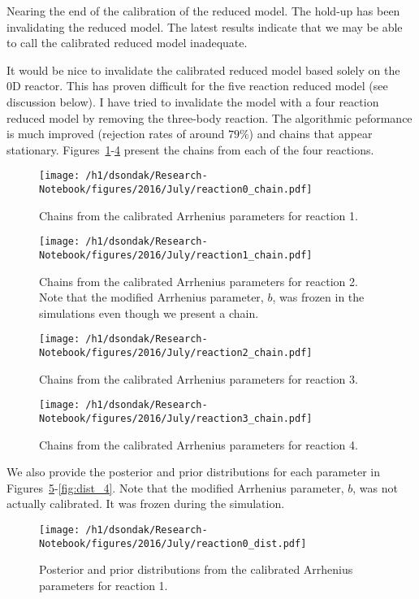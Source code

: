 
Nearing the end of the calibration of the reduced model.  The hold-up has been invalidating the
reduced model.  The latest results indicate that we may be able to call the calibrated
reduced model inadequate.

It would be nice to invalidate the calibrated reduced model based solely on the 0D reactor.  This has proven difficult
for the five reaction reduced model (see discussion below).  I have tried to invalidate the model with a four
reaction reduced model by removing the three-body reaction.  The algorithmic peformance is much improved (rejection
rates of around $79\%$) and chains that appear stationary.  Figures~\ref{fig:chain_1}-\ref{fig:chain_4} present
the chains from each of the four reactions.
\begin{figure}[h!]
  \centering
  \texttt{[image: /h1/dsondak/Research-Notebook/figures/2016/July/reaction0\_chain.pdf]}
  \caption{Chains from the calibrated Arrhenius parameters for reaction 1.}
  \label{fig:chain_1}
\end{figure}
\begin{figure}[h!]
  \centering
  \texttt{[image: /h1/dsondak/Research-Notebook/figures/2016/July/reaction1\_chain.pdf]}
  \caption{Chains from the calibrated Arrhenius parameters for reaction 2.  Note that the modified Arrhenius
           parameter, $b$, was frozen in the simulations even though we present a chain.}
  \label{fig:chain_2}
\end{figure}
\begin{figure}[h!]
  \centering
  \texttt{[image: /h1/dsondak/Research-Notebook/figures/2016/July/reaction2\_chain.pdf]}
  \caption{Chains from the calibrated Arrhenius parameters for reaction 3.}
  \label{fig:chain_3}
\end{figure}
\begin{figure}[h!]
  \centering
  \texttt{[image: /h1/dsondak/Research-Notebook/figures/2016/July/reaction3\_chain.pdf]}
  \caption{Chains from the calibrated Arrhenius parameters for reaction 4.}
  \label{fig:chain_4}
\end{figure}
We also provide the posterior and prior distributions for each parameter in Figures~\ref{fig:dist_1}-\ref{fig:dist_4}.  
Note that the modified Arrhenius parameter, $b$, was not actually calibrated.  It was frozen during the simulation.
\begin{figure}[h!]
  \centering
  \texttt{[image: /h1/dsondak/Research-Notebook/figures/2016/July/reaction0\_dist.pdf]}
  \caption{Posterior and prior distributions from the calibrated Arrhenius parameters for reaction 1.}
  \label{fig:dist_1}
\end{figure}
